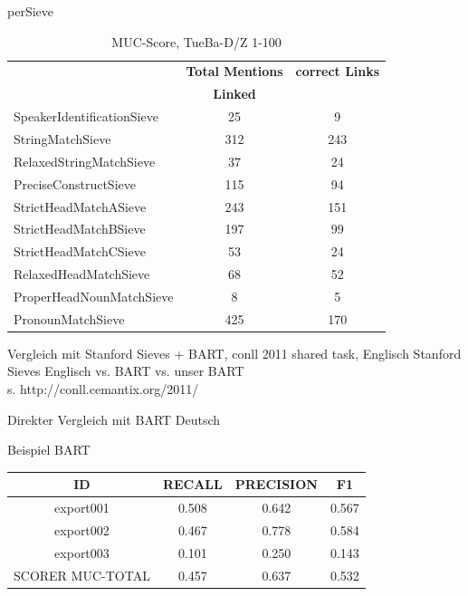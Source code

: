 \documentclass[11pt,a4paper]{beamer}
\begin{document}
\begin{frame}{perSieve}
\begin{table}[h]
\begin{tabular}{lcc}
                           & \textbf{Total Mentions} & \textbf{correct Links} \\
                          &\textbf{Linked}			&\\
SpeakerIdentificationSieve & 25                             & 9                      \\
StringMatchSieve           & 312                            & 243   					\\
RelaxedStringMatchSieve    & 37                             & 24                     \\
PreciseConstructSieve      & 115                            & 94                     \\
StrictHeadMatchASieve      & 243                            & 151                    \\
StrictHeadMatchBSieve      & 197                            & 99                     \\
StrictHeadMatchCSieve      & 53                             & 24                     \\
RelaxedHeadMatchSieve      & 68                             & 52                     \\
ProperHeadNounMatchSieve   & 8                              & 5                      \\
PronounMatchSieve          & 425                            & 170                    \\
\end{tabular}
\caption{MUC-Score, TueBa-D/Z 1-100}
\end{table}
\end{frame}


\begin{frame}{Vergleich mit Stanford Sieves + BART, conll 2011 shared task, Englisch}
Stanford Sieves Englisch vs. BART vs. unser BART\\

s. http://conll.cemantix.org/2011/
\end{frame}

\begin{frame}{Direkter Vergleich mit BART Deutsch}

Beispiel BART

\begin{tabular}{|c|c|c|c|}
\hline 
ID & RECALL & PRECISION & F1 \\ 
\hline 
export001 & 0.508 & 0.642 & 0.567 \\ 
\hline 
export002 & 0.467 & 0.778   & 0.584 \\ 
\hline 
export003 & 0.101 & 0.250 & 0.143 \\ 
\hline 
SCORER MUC-TOTAL & 0.457 & 0.637   & 0.532 \\
\hline

\end{tabular} 
\end{frame}
\end{document}
